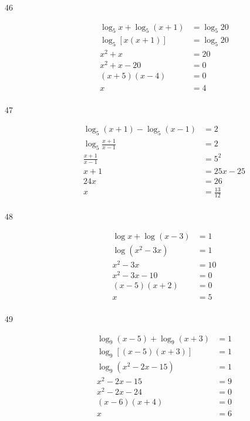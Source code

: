 \documentclass{exam}
\begin{document}
\begin{description}
      \item[46] 
        \begin{align*}
          \log_5 x + \log_5(x + 1) &= \log_5 20 \\
          \log_5 [x(x + 1)]        &= \log_5 20 \\
          x^2 + x                  &= 20 \\
          x^2 + x - 20             &= 0 \\
          (x + 5)(x - 4)           &= 0 \\
          x                        &= \boxed{4} \\
        \end{align*}

      \item[47] 
        \begin{align*}
          \log_5 (x + 1) - \log_5 (x - 1) &= 2 \\
          \log_5 \frac{x + 1}{x - 1}      &= 2 \\
          \frac{x + 1}{x - 1}             &= 5^2 \\
          x + 1                           &= 25x - 25 \\
          24x                             &= 26 \\
          x                               &= \boxed{\frac{13}{12}} \\
        \end{align*}

      \item[48] 
        \begin{align*}
          \log x + \log (x - 3)        &= 1 \\
          \log \left( x^2 - 3x \right) &= 1 \\
          x^2 - 3x                     &= 10 \\
          x^2 - 3x - 10                &= 0 \\
          (x - 5)(x + 2)               &= 0 \\
          x                            &= \boxed{5} \\
        \end{align*}

      \item[49] 
        \begin{align*}
          \log_9(x - 5) + \log_9(x + 3)      &= 1 \\
          \log_9[ (x - 5)(x + 3) ]           &= 1 \\
          \log_9\left( x^2 - 2x - 15 \right) &= 1 \\
          x^2 - 2x - 15                      &= 9 \\
          x^2 - 2x - 24                      &= 0 \\
          (x - 6)(x + 4)                     &= 0 \\
          x                                  &= \boxed{6} \\
        \end{align*}


\end{description}
\end{document}
